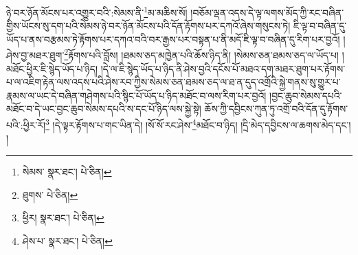 ཉེ་བར་ཉོན་མོངས་པར་འགྱུར་བའི་:སེམས་ནི་\footnote{སེམས་  སྣར་ཐང་།  པེ་ཅིན། }མ་མཆིས་སོ། །བཅོམ་ལྡན་འདས་དེ་ལྟ་ལགས་མོད་ཀྱི་རང་བཞིན་གྱིས་ཡོངས་སུ་དག་པའི་སེམས་ཉེ་བར་ཉོན་མོངས་པའི་དོན་རྟོགས་པར་དཀའོ་ཞེས་གསུངས་ཏེ། ཇི་ལྟ་བ་བཞིན་དུ་ཡོད་པ་ནས་བརྩམས་ཏེ་རྟོགས་པར་དཀའ་བའི་བར་རྒྱས་པར་བསྟན་པ་ནི་མདོ་ཇི་ལྟ་བ་བཞིན་དུ་རིག་པར་བྱའོ། །ཤེས་བྱ་མཐར་ཐུག་\footnote{ཐུགས་  པེ་ཅིན། }རྟོགས་པའི་བློས། །ཐམས་ཅད་མཁྱེན་པའི་ཆོས་ཉིད་ནི། །སེམས་ཅན་ཐམས་ཅད་ལ་ཡོད་པ། །མཐོང་ཕྱིར་ཇི་སྙེད་ཡོད་པ་ཉིད། །དེ་ལ་ཇི་སྙེད་ཡོད་པ་ཉིད་ནི་ཤེས་བྱའི་དངོས་པོ་མཐའ་དག་མཐར་ཐུག་པར་རྟོགས་པ་ལ་འཇིག་རྟེན་ལས་འདས་པའི་ཤེས་རབ་ཀྱིས་སེམས་ཅན་ཐམས་ཅད་ལ་ཐ་ན་དུད་འགྲོའི་སྐྱེ་གནས་སུ་གྱུར་པ་རྣམས་ལ་ཡང་དེ་བཞིན་གཤེགས་པའི་སྙིང་པོ་ཡོད་པ་ཉིད་མཐོང་བ་ལས་རིག་པར་བྱའོ། །བྱང་ཆུབ་སེམས་དཔའི་མཐོང་བ་དེ་ཡང་བྱང་ཆུབ་སེམས་དཔའི་ས་དང་པོ་ཉིད་ལས་སྐྱེ་སྟེ། ཆོས་ཀྱི་དབྱིངས་ཀུན་ཏུ་འགྲོ་བའི་དོན་དུ་རྟོགས་པའི་:ཕྱིར་རོ།\footnote{ཕྱིར།  སྣར་ཐང་།  པེ་ཅིན། } །དེ་ལྟར་རྟོགས་པ་གང་ཡིན་དེ། །སོ་སོ་རང་ཤེས་\footnote{ཤེས་པ་  སྣར་ཐང་།  པེ་ཅིན། }མཐོང་བ་ཉིད། །དྲི་མེད་དབྱིངས་ལ་ཆགས་མེད་དང་། །
